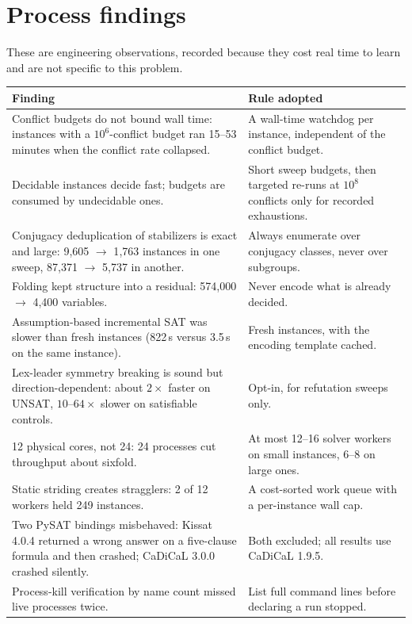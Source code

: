 \documentclass[11pt]{article}
\begin{document}
\section{Process findings}

These are engineering observations, recorded because they cost real time to learn and are not specific
to this problem.

\begin{center}
\begin{tabular}{p{}p{}}
\toprule
Finding & Rule adopted \\
\midrule
Conflict budgets do not bound wall time: instances with a $10^6$-conflict budget ran 15--53 minutes when
the conflict rate collapsed. & A wall-time watchdog per instance, independent of the conflict budget. \\
Decidable instances decide fast; budgets are consumed by undecidable ones. & Short sweep budgets, then
targeted re-runs at $10^{8}$ conflicts only for recorded exhaustions. \\
Conjugacy deduplication of stabilizers is exact and large: 9{,}605 $\to$ 1{,}763 instances in one sweep,
87{,}371 $\to$ 5{,}737 in another. & Always enumerate over conjugacy classes, never over subgroups. \\
Folding kept structure into a residual: 574{,}000 $\to$ 4{,}400 variables. & Never encode what is
already decided. \\
Assumption-based incremental SAT was slower than fresh instances (822\,s versus 3.5\,s on the same
instance). & Fresh instances, with the encoding template cached. \\
Lex-leader symmetry breaking is sound but direction-dependent: about $2\times$ faster on UNSAT,
$10$--$64\times$ slower on satisfiable controls. & Opt-in, for refutation sweeps only. \\
12 physical cores, not 24: 24 processes cut throughput about sixfold. & At most 12--16 solver workers on
small instances, 6--8 on large ones. \\
Static striding creates stragglers: 2 of 12 workers held 249 instances. & A cost-sorted work queue with
a per-instance wall cap. \\
Two PySAT bindings misbehaved: Kissat 4.0.4 returned a wrong answer on a five-clause formula and then
crashed; CaDiCaL 3.0.0 crashed silently. & Both excluded; all results use CaDiCaL 1.9.5. \\
Process-kill verification by name count missed live processes twice. & List full command lines before
declaring a run stopped. \\
\bottomrule
\end{tabular}
\end{center}
\end{document}
